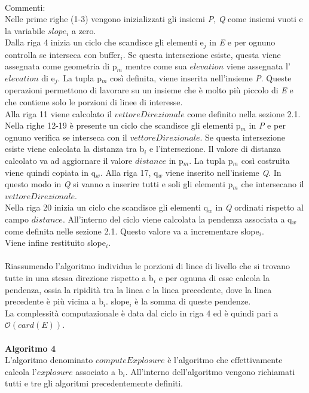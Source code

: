 \mbox{}\\
Commenti:\\
Nelle prime righe (1-3) vengono inizializzati gli insiemi \textit{P}, \textit{Q} come insiemi vuoti e la variabile $slope_i$ a zero.\\
Dalla riga 4 inizia un ciclo che scandisce gli elementi e$_j$ in \textit{E} e per ognuno controlla se interseca con buffer$_i$. Se questa intersezione esiste, questa viene assegnata come geometria di p$_m$ mentre come sua $elevation$ viene assegnata l'$elevation$ di e$_j$. La tupla p$_m$ così definita, viene inserita nell'insieme \textit{P}. Queste operazioni permettono di lavorare su un insieme che è molto più piccolo di \textit{E} e che contiene solo le porzioni di linee di interesse.\\
Alla riga 11 viene calcolato il $vettoreDirezionale$ come definito nella sezione 2.1.\\
Nella righe 12-19 è presente un ciclo che scandisce gli elementi p$_m$ in \textit{P} e per ognuno verifica se interseca con il $vettoreDirezionale$. Se questa intersezione esiste viene calcolata la distanza tra b$_i$ e l'intersezione. Il valore di distanza calcolato va ad aggiornare il valore $distance$ in p$_m$. La tupla p$_m$  così costruita viene quindi copiata in q$_w$. Alla riga 17, q$_w$ viene inserito nell'insieme  \textit{Q}. In questo modo in \textit{Q} si vanno a inserire tutti e soli gli elementi p$_m$ che intersecano il $vettoreDirezionale$. \\
Nella riga 20 inizia un ciclo che scandisce gli elementi q$_w$ in \textit{Q} ordinati rispetto al campo $distance$. All'interno del ciclo viene calcolata la pendenza associata a q$_w$ come definita nelle sezione 2.1. Questo valore va a incrementare slope$_i$.\\ 
Viene infine restituito slope$_i$.\\
\mbox{}\\
Riassumendo l'algoritmo individua le porzioni di linee di livello che si trovano tutte in una stessa direzione rispetto a b$_i$ e per ognuna di esse calcola la pendenza, ossia la ripidità tra la linea e la linea precedente, dove la linea precedente è più vicina a b$_i$. slope$_i$ è la somma di queste pendenze.\\
La complessità computazionale è data dal ciclo in riga 4 ed è quindi pari a $\mathcal{O}(card(\textit{E}))$.\\
\mbox{}\\
\newpage
\textbf{Algoritmo 4}\\
\newline
L'algoritmo denominato $computeExplosure$ è l'algoritmo che effettivamente calcola l'$explosure$ associato a b$_i$. All'interno dell'algoritmo vengono richiamati tutti e tre gli algoritmi precedentemente definiti.\\

